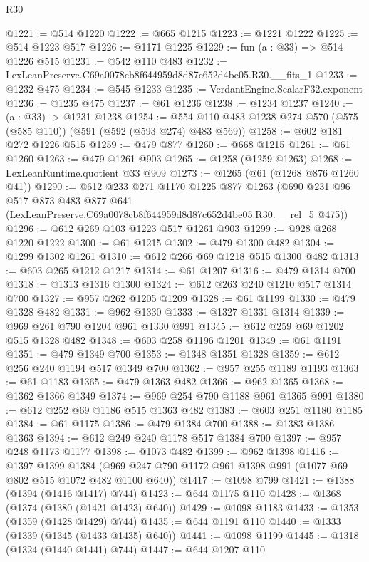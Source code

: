 \begin{lexlean}{R30}
\begin{coremodule}
@1221 := @514 @1220
@1222 := @665 @1215
@1223 := @1221 @1222
@1225 := @514 @1223 @517
@1226 := @1171 @1225
@1229 := fun (a : @33) => @514 @1226 @515
@1231 := @542 @110 @483
@1232 := LexLeanPreserve.C69a0078cb8f644959d8d87c652d4be05.R30.__fits_1
@1233 := @1232 @475
@1234 := @545 @1233
@1235 := VerdantEngine.ScalarF32.exponent
@1236 := @1235 @475
@1237 := @61 @1236
@1238 := @1234 @1237
@1240 := (a : @33) -> @1231 @1238
@1254 := @554 @110 @483 @1238 @274 @570 (@575 (@585 @110)) (@591 (@592 (@593 @274) @483 @569))
@1258 := @602 @181 @272 @1226 @515
@1259 := @479 @877
@1260 := @668 @1215
@1261 := @61 @1260
@1263 := @479 @1261 @903
@1265 := @1258 (@1259 @1263)
@1268 := LexLeanRuntime.quotient @33 @909
@1273 := @1265 (@61 (@1268 @876 @1260 @41))
@1290 := @612
    @233
    @271
    @1170
    @1225
    @877
    @1263
    (@690
      @231
      @96
      @517
      @873
      @483
      @877
      @641
      (LexLeanPreserve.C69a0078cb8f644959d8d87c652d4be05.R30.__rel_5 @475))
@1296 := @612 @269 @103 @1223 @517 @1261 @903
@1299 := @928 @268 @1220 @1222
@1300 := @61 @1215
@1302 := @479 @1300 @482
@1304 := @1299 @1302 @1261
@1310 := @612 @266 @69 @1218 @515 @1300 @482
@1313 := @603 @265 @1212 @1217
@1314 := @61 @1207
@1316 := @479 @1314 @700
@1318 := @1313 @1316 @1300
@1324 := @612 @263 @240 @1210 @517 @1314 @700
@1327 := @957 @262 @1205 @1209
@1328 := @61 @1199
@1330 := @479 @1328 @482
@1331 := @962 @1330
@1333 := @1327 @1331 @1314
@1339 := @969 @261 @790 @1204 @961 @1330 @991
@1345 := @612 @259 @69 @1202 @515 @1328 @482
@1348 := @603 @258 @1196 @1201
@1349 := @61 @1191
@1351 := @479 @1349 @700
@1353 := @1348 @1351 @1328
@1359 := @612 @256 @240 @1194 @517 @1349 @700
@1362 := @957 @255 @1189 @1193
@1363 := @61 @1183
@1365 := @479 @1363 @482
@1366 := @962 @1365
@1368 := @1362 @1366 @1349
@1374 := @969 @254 @790 @1188 @961 @1365 @991
@1380 := @612 @252 @69 @1186 @515 @1363 @482
@1383 := @603 @251 @1180 @1185
@1384 := @61 @1175
@1386 := @479 @1384 @700
@1388 := @1383 @1386 @1363
@1394 := @612 @249 @240 @1178 @517 @1384 @700
@1397 := @957 @248 @1173 @1177
@1398 := @1073 @482
@1399 := @962 @1398
@1416 := @1397
    @1399
    @1384
    (@969 @247 @790 @1172 @961 @1398 @991 (@1077 @69 @802 @515 @1072 @482 @1100 @640))
@1417 := @1098 @799
@1421 := @1388 (@1394 (@1416 @1417) @744)
@1423 := @644 @1175 @110
@1428 := @1368 (@1374 (@1380 (@1421 @1423) @640))
@1429 := @1098 @1183
@1433 := @1353 (@1359 (@1428 @1429) @744)
@1435 := @644 @1191 @110
@1440 := @1333 (@1339 (@1345 (@1433 @1435) @640))
@1441 := @1098 @1199
@1445 := @1318 (@1324 (@1440 @1441) @744)
@1447 := @644 @1207 @110

\end{coremodule}
\end{lexlean}
